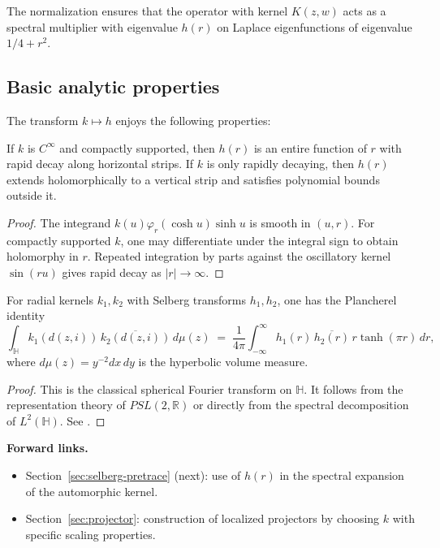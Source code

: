 \begin{remark}
The normalization ensures that the operator with kernel $K(z,w)$
acts as a spectral multiplier with eigenvalue $h(r)$
on Laplace eigenfunctions of eigenvalue $1/4+r^2$.
\end{remark}

\subsection{Basic analytic properties}

The transform $k \mapsto h$ enjoys the following properties:

\begin{lemma}
\label{lem:selberg-decay}
If $k$ is $C^\infty$ and compactly supported, then $h(r)$
is an entire function of $r$ with rapid decay along horizontal strips.
If $k$ is only rapidly decaying, then $h(r)$ extends holomorphically
to a vertical strip and satisfies polynomial bounds outside it.
\end{lemma}

\begin{proof}
The integrand $k(u)\varphi_r(\cosh u)\sinh u$ is smooth in $(u,r)$.
For compactly supported $k$, one may differentiate under the integral sign
to obtain holomorphy in $r$.
Repeated integration by parts against the oscillatory kernel $\sin(ru)$
gives rapid decay as $|r|\to\infty$.
\end{proof}

\begin{lemma}
\label{lem:selberg-plancherel}
For radial kernels $k_1,k_2$ with Selberg transforms $h_1,h_2$,
one has the Plancherel identity
\[
  \int_{\mathbb{H}} k_1(d(z,i))\,\overline{k_2(d(z,i))}\,d\mu(z)
  \;=\; \frac{1}{4\pi} \int_{-\infty}^\infty
      h_1(r)\,\overline{h_2(r)}\, r\tanh(\pi r)\,dr,
\]
where $d\mu(z)=y^{-2}dx\,dy$ is the hyperbolic volume measure.
\end{lemma}

\begin{proof}
This is the classical spherical Fourier transform on $\mathbb{H}$.
It follows from the representation theory of $PSL(2,\mathbb{R})$
or directly from the spectral decomposition of $L^2(\mathbb{H})$.
See \cite{Helgason1984, Iwaniec2002}.
\end{proof}

\medskip
\noindent
\textbf{Forward links.}
\begin{itemize}
  \item Section~\ref{sec:selberg-pretrace} (next): use of $h(r)$
        in the spectral expansion of the automorphic kernel.
  \item Section~\ref{sec:projector}: construction of localized projectors
        by choosing $k$ with specific scaling properties.
\end{itemize}

